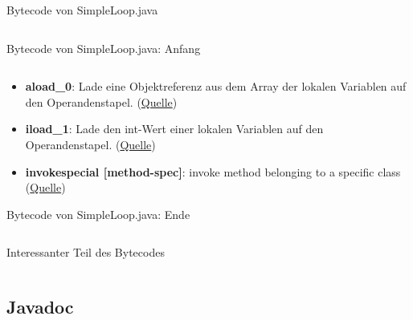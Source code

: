 \documentclass[usepdftitle=false,hyperref={pdfpagelabels=false}]{beamer}
\begin{document}
\begin{frame}{Bytecode von SimpleLoop.java}
    \inputminted[linenos=false, numbersep=5pt, tabsize=4, fontsize=\tiny]{java}{Bytecode.txt}
\end{frame}
\begin{frame}{Bytecode von SimpleLoop.java: Anfang}
    \inputminted[linenos=false, numbersep=5pt, tabsize=4, firstline=1, lastline=7, fontsize=\tiny]{java}{Bytecode.txt}
    \begin{itemize}
        \item \textbf{aload\_0}: Lade eine Objektreferenz aus dem Array der lokalen Variablen auf den Operandenstapel. (\href{http://www.javaseiten.de/jvmisa.html\#aload\_0}{Quelle})
        \item \textbf{iload\_1}: Lade den int-Wert einer lokalen Variablen auf den Operandenstapel. (\href{http://www.javaseiten.de/jvmisi.html\#iload_1}{Quelle})
        \item \textbf{invokespecial [method-spec]}: invoke method belonging to a specific class (\href{https://www.vmth.ucdavis.edu/incoming/Jasmin/ref--33.html}{Quelle})
    \end{itemize}
\end{frame}

\begin{frame}{Bytecode von SimpleLoop.java: Ende}
    \inputminted[linenos=false, numbersep=5pt, tabsize=4, firstline=9, lastline=32, fontsize=\tiny]{java}{Bytecode.txt}
\end{frame}

\begin{frame}{Interessanter Teil des Bytecodes}
    \inputminted[linenos=false, numbersep=5pt, tabsize=4, fontsize=\tiny]{java}{Bytecode-interessant.txt}
\end{frame}

\subsection{Javadoc}
\end{document}
